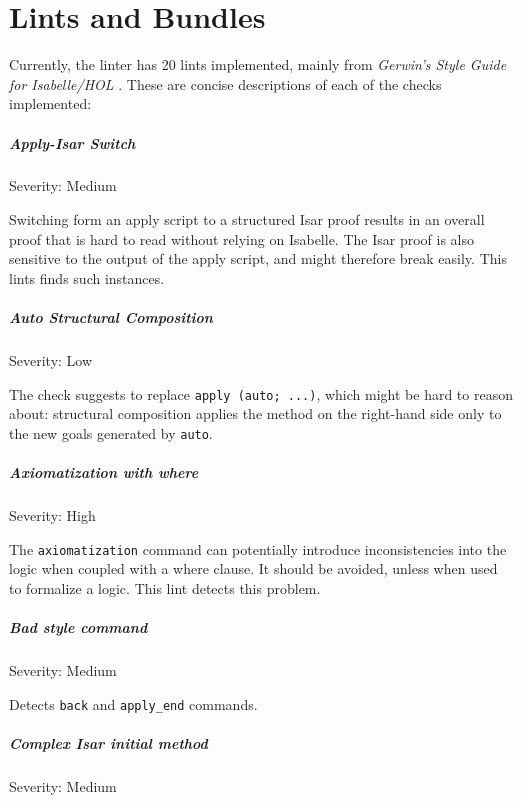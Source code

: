 \appendix
\chapter{Lints and Bundles}

Currently, the linter has 20 lints implemented, mainly from 
\textit{Gerwin's Style Guide for Isabelle/HOL} \cite{klein_2015,klein_2015_2}. These are
concise descriptions of each of the checks implemented:
\paragraph{Apply-Isar Switch}\label{lint:applyisarswitch}
Severity: Medium

Switching form an apply script to a structured Isar proof results in an overall 
proof that is hard to read without relying on Isabelle. The Isar proof is also
sensitive to the output of the apply script, and might therefore break easily.
This lints finds such instances.

\paragraph{Auto Structural Composition}
Severity: Low

The check suggests to replace \texttt{apply (auto; ...)}, which might be hard to
reason about: structural composition applies the method on the right-hand side only
to the new goals generated by \texttt{auto}.

\paragraph{Axiomatization with where}
Severity: High

The \texttt{axiomatization} command can potentially introduce inconsistencies into 
the logic when coupled with a where clause. It should be avoided, unless when used
to formalize a logic. This lint detects this problem.

\paragraph{Bad style command}
Severity: Medium

Detects \texttt{back} and \texttt{apply\_end} commands.
\paragraph{Complex Isar initial method}\label{lint:complexisar}
Severity: Medium

